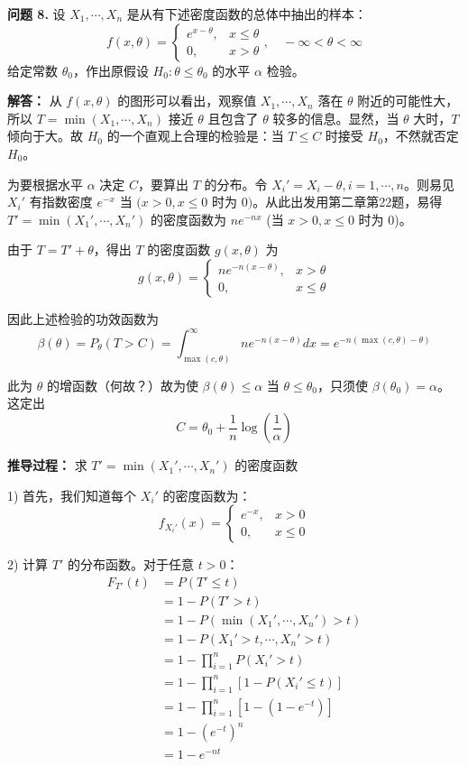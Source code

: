 \documentclass[UTF8]{report}
\theoremstyle{MyLineTheoremStyle} %
\theoremstyle{MyBlockTheoremStyle} %
\theoremstyle{MySubsubsectionStyle} %
\begin{document}
\textbf{问题 8.} 设 $X_1,\cdots,X_n$ 是从有下述密度函数的总体中抽出的样本：
$$
f(x,\theta)=\begin{cases}
e^{x-\theta}, & x \leq \theta \\
0, & x > \theta
\end{cases}, \quad -\infty < \theta < \infty
$$
给定常数 $\theta_0$，作出原假设 $H_0:\theta\leq\theta_0$ 的水平 $\alpha$ 检验。

\textbf{解答：}
从 $f(x,\theta)$ 的图形可以看出，观察值 $X_1,\cdots,X_n$ 落在 $\theta$ 附近的可能性大，所以 $T=\min(X_1,\cdots,X_n)$ 接近 $\theta$ 且包含了 $\theta$ 较多的信息。显然，当 $\theta$ 大时，$T$ 倾向于大。故 $H_0$ 的一个直观上合理的检验是：当 $T\leq C$ 时接受 $H_0$，不然就否定 $H_0$。

为要根据水平 $\alpha$ 决定 $C$，要算出 $T$ 的分布。令 $X_i'=X_i-\theta, i=1,\cdots,n$。则易见 $X_i'$ 有指数密度 $e^{-x}$ 当 $(x>0, x\leq 0$ 时为 $0)$。从此出发用第二章第22题，易得 $T'=\min(X_1',\cdots,X_n')$ 的密度函数为 $ne^{-nx}$ (当 $x>0, x\leq 0$ 时为 $0$)。

由于 $T=T'+\theta$，得出 $T$ 的密度函数 $g(x,\theta)$ 为
$$
g(x,\theta)=\begin{cases}
ne^{-n(x-\theta)}, & x > \theta \\
0, & x \leq \theta
\end{cases}
$$

因此上述检验的功效函数为
$$
\beta(\theta) = P_\theta(T > C) = \int_{\max(c,\theta)}^{\infty} ne^{-n(x-\theta)}dx = e^{-n(\max(c,\theta)-\theta)}
$$

此为 $\theta$ 的增函数（何故？）故为使 $\beta(\theta)\leq\alpha$ 当 $\theta\leq\theta_0$，只须使 $\beta(\theta_0)=\alpha$。这定出
$$
C = \theta_0 + \frac{1}{n}\log\left(\frac{1}{\alpha}\right)
$$


\textbf{推导过程：} 求 $T'=\min(X_1',\cdots,X_n')$ 的密度函数

1) 首先，我们知道每个 $X_i'$ 的密度函数为：
$$
f_{X_i'}(x) = \begin{cases}
e^{-x}, & x > 0 \\
0, & x \leq 0
\end{cases}
$$

2) 计算 $T'$ 的分布函数。对于任意 $t > 0$：
\begin{align*}
F_{T'}(t) &= P(T' \leq t) \\
&= 1 - P(T' > t) \\
&= 1 - P(\min(X_1',\cdots,X_n') > t) \\
&= 1 - P(X_1' > t, \cdots, X_n' > t) \\
&= 1 - \prod_{i=1}^n P(X_i' > t) \\
&= 1 - \prod_{i=1}^n [1 - P(X_i' \leq t)] \\
&= 1 - \prod_{i=1}^n [1 - (1-e^{-t})] \\
&= 1 - (e^{-t})^n \\
&= 1 - e^{-nt}
\end{align*}
\end{document}
